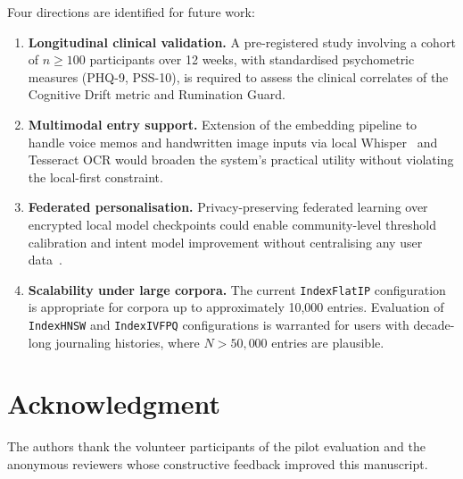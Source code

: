 \documentclass[12pt, letterpaper]{article}
\begin{document}
Four directions are identified for future work:

\begin{enumerate}
  \item \textbf{Longitudinal clinical validation.}
    A pre-registered study involving a cohort of
    $n \geq 100$ participants over 12 weeks, with
    standardised psychometric measures (PHQ-9, PSS-10), is
    required to assess the clinical correlates of the
    Cognitive Drift metric and Rumination Guard.

  \item \textbf{Multimodal entry support.}
    Extension of the embedding pipeline to handle voice memos
    and handwritten image inputs via local
    Whisper~\cite{radford2023whisper} and Tesseract OCR would
    broaden the system's practical utility without violating
    the local-first constraint.

  \item \textbf{Federated personalisation.}
    Privacy-preserving federated learning over encrypted local
    model checkpoints could enable community-level threshold
    calibration and intent model improvement without
    centralising any user data~\cite{li2020federated}.

  \item \textbf{Scalability under large corpora.}
    The current \texttt{IndexFlatIP} configuration is
    appropriate for corpora up to approximately 10,000
    entries.
    Evaluation of \texttt{IndexHNSW} and
    \texttt{IndexIVFPQ} configurations is warranted for users
    with decade-long journaling histories, where
    $N > 50{,}000$ entries are plausible.
\end{enumerate}

\section*{Acknowledgment}

The authors thank the volunteer participants of the pilot
evaluation and the anonymous reviewers whose constructive
feedback improved this manuscript.


\end{document}
